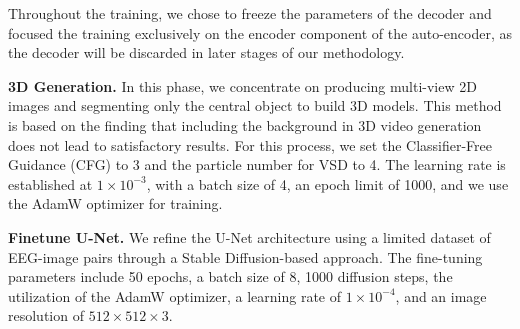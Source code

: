 \documentclass[conference]{IEEEtran}
\begin{document}
Throughout the training, we chose to freeze the parameters of the decoder and focused the training exclusively on the encoder component of the auto-encoder, as the decoder will be discarded in later stages of our methodology.

\textbf{3D Generation.} In this phase, we concentrate on producing multi-view 2D images and segmenting only the central object to build 3D models. This method is based on the finding that including the background in 3D video generation does not lead to satisfactory results. For this process, we set the Classifier-Free Guidance (CFG) to 3 and the particle number for VSD to 4. The learning rate is established at \( 1 \times 10^{-3} \), with a batch size of 4, an epoch limit of 1000, and we use the AdamW optimizer for training.

\textbf{Finetune U-Net.} We refine the U-Net architecture using a limited dataset of EEG-image pairs through a Stable Diffusion-based approach. The fine-tuning parameters include 50 epochs, a batch size of 8, 1000 diffusion steps, the utilization of the AdamW optimizer, a learning rate of $ 1 \times 10^{-4} $, and an image resolution of $512\times512\times3$.

\end{document}

